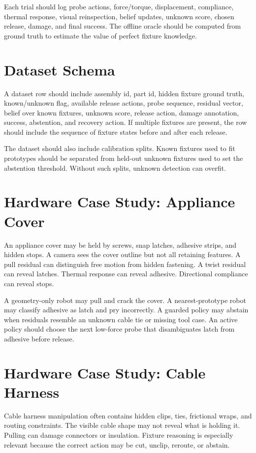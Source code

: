 \documentclass{article}
\begin{document}
Each trial should log probe actions, force/torque, displacement, compliance,
thermal response, visual reinspection, belief updates, unknown score, chosen
release, damage, and final success. The offline oracle should be computed from
ground truth to estimate the value of perfect fixture knowledge.

\section{Dataset Schema}

A dataset row should include assembly id, part id, hidden fixture ground truth,
known/unknown flag, available release actions, probe sequence, residual vector,
belief over known fixtures, unknown score, release action, damage annotation,
success, abstention, and recovery action. If multiple fixtures are present,
the row should include the sequence of fixture states before and after each
release.

The dataset should also include calibration splits. Known fixtures used to fit
prototypes should be separated from held-out unknown fixtures used to set the
abstention threshold. Without such splits, unknown detection can overfit.

\section{Hardware Case Study: Appliance Cover}

An appliance cover may be held by screws, snap latches, adhesive strips, and
hidden stops. A camera sees the cover outline but not all retaining features.
A pull residual can distinguish free motion from hidden fastening. A twist
residual can reveal latches. Thermal response can reveal adhesive. Directional
compliance can reveal stops.

A geometry-only robot may pull and crack the cover. A nearest-prototype robot
may classify adhesive as latch and pry incorrectly. A guarded policy may
abstain when residuals resemble an unknown cable tie or missing tool case. An
active policy should choose the next low-force probe that disambiguates latch
from adhesive before release.

\section{Hardware Case Study: Cable Harness}

Cable harness manipulation often contains hidden clips, ties, frictional
wraps, and routing constraints. The visible cable shape may not reveal what is
holding it. Pulling can damage connectors or insulation. Fixture reasoning is
especially relevant because the correct action may be cut, unclip, reroute, or
abstain.
\end{document}
